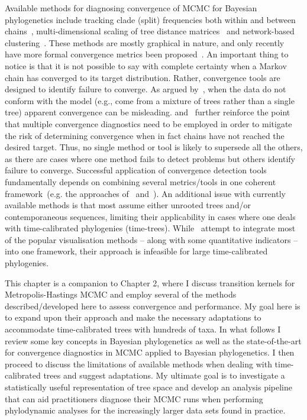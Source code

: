 Available methods for diagnosing convergence of MCMC for Bayesian phylogenetics include tracking clade (split) frequencies both within and between chains~\citep{Nylander2008}, multi-dimensional scaling of tree distance matrices~\cite{Hillis2005,Matsen2006} and network-based clustering~\citep{Whidden2015}. 
These methods are mostly graphical in nature, and only recently have more formal convergence metrics been proposed~\citep{Whidden2015,Lanfear2016}.
An important thing to notice is that it is not possible to say with complete certainty when a Markov chain has converged to its target distribution.
Rather, convergence tools are designed to identify failure to converge.
As argued by~\cite{Mossel2005}, when the data do not conform with the model (e.g., come from a mixture of trees rather than a single tree) apparent convergence can be misleading.
\cite{Cowles1996} and~\cite{Brooks1998} further reinforce the point that multiple convergence diagnostics need to be employed in order to mitigate the risk of determining convergence when in fact chains have not reached the desired target.
Thus, no single method or tool is likely to supersede all the others, as there are cases where one method fails to detect problems but others identify failure to converge. 
Successful application of convergence detection tools fundamentally depends on combining several metrics/tools in one coherent framework~(e.g. the approaches of~\cite{Nylander2008} and~\cite{Lanfear2016}).
An additional issue with currently available methods is that most assume either unrooted trees and/or contemporaneous sequences, limiting their applicability in cases where one deals with time-calibrated phylogenies (time-trees).
While~\cite{Warren2017} attempt to integrate most of the popular visualisation methods -- along with some quantitative indicators -- into one framework, their approach is infeasible for large time-calibrated phylogenies.

This chapter is a companion to Chapter 2, where I discuss transition kernels for Metropolis-Hastings MCMC and employ several of the methods described/developed here to assess convergence and performance.
My goal here is to expand upon their approach and make the necessary adaptations to accommodate time-calibrated trees with hundreds of taxa.
In what follows I review  some key concepts in Bayesian phylogenetics as well as the state-of-the-art for convergence diagnostics in MCMC applied to Bayesian phylogenetics.
I then proceed to discuss the limitations of available methods when dealing with time-calibrated trees and suggest adaptations.
My ultimate goal is to investigate a statistically useful representation of tree space and develop an analysis pipeline that can aid practitioners diagnose their MCMC runs when performing phylodynamic analyses for the increasingly larger data sets found in practice.

